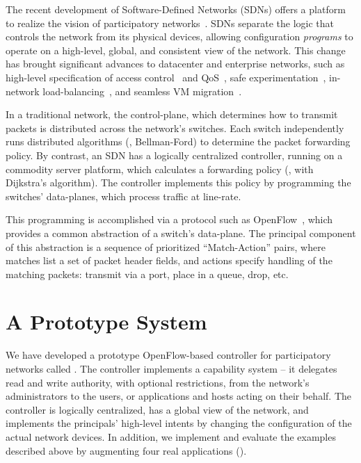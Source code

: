 The recent development of Software-Defined Networks (SDNs)
offers a platform to realize the vision of participatory networks~\cite{Greenberg:2005,McKeown:2008}.
SDNs separate
the logic that controls the network from its physical
devices, allowing configuration \emph{programs} to operate on a
high-level, global, and consistent view of the network. 
This change has brought significant advances to datacenter and
enterprise networks, such as high-level
specification of access control~\cite{Nayak:2009} and
QoS~\cite{Kim:2010}, safe experimentation~\cite{Sherwood:2010},
in-network load-balancing~\cite{wang11wild}, and seamless VM 
migration~\cite{Erickson:2008}.

In a traditional network, the control-plane, which determines how
to transmit packets is distributed across the network's switches. Each
switch independently runs distributed algorithms (\eg, Bellman-Ford) to determine the
packet forwarding policy. By contrast, an SDN has a logically centralized
controller, running on a commodity server platform, which calculates
a forwarding policy (\eg, with Dijkstra's algorithm). The controller implements
this policy by programming the switches' data-planes, which process
traffic at line-rate.

This programming is accomplished via a protocol such as
OpenFlow~\cite{McKeown:2008}, which provides a common
abstraction of a switch's data-plane. The principal component of this
abstraction is a sequence of prioritized ``Match-Action'' pairs, where
matches list a set of packet header fields, and actions specify handling
of the matching packets: transmit via a port, place in a queue, drop, etc.

\section{A Prototype System}

We have developed a prototype OpenFlow-based controller
for participatory networks called \sys.
The \sys controller implements a capability system --
it delegates read and
write authority, with optional restrictions, from the network's
administrators to the users, or applications and hosts acting on
their behalf.  The controller is logically centralized, has a global
view of the network, and implements the principals' high-level
intents by changing the configuration of the actual network devices.
In addition, we implement and evaluate the examples described
above by augmenting four real applications ().

